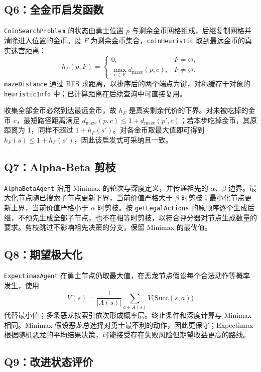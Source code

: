 \documentclass[UTF8,fontset=fandol,a4paper,11pt]{ctexart}
\newcommand{\code}[1]{\texttt{#1}}
\newcommand{\mazed}{d_{\mathrm{maze}}}
\begin{document}
\subsection{Q6：全金币启发函数}

\code{CoinSearchProblem} 的状态由勇士位置 $p$ 与剩余金币网格组成，后继复制网格并清除进入位置的金币。设 $F$ 为剩余金币集合，\code{coinHeuristic} 取到最远金币的真实迷宫距离：
\[
  h_F(p,F)=
  \begin{cases}
    0, & F=\varnothing,\\
    \displaystyle\max_{c\in F}\mazed(p,c), & F\ne\varnothing.
  \end{cases}
\]
\code{mazeDistance} 通过 BFS 求距离，以排序后的两个端点为键，对称缓存于对象的 \code{heuristicInfo} 中；已计算距离在后续查询中可直接复用。

收集全部金币必然到达最远金币，故 $h_F$ 是真实剩余代价的下界。对未被吃掉的金币 $c$，最短路径距离满足 $\mazed(p,c)\leq1+\mazed(p',c)$；若本步吃掉金币，其原距离为 1，同样不超过 $1+h_F(s')$。对各金币取最大值即可得到 $h_F(s)\leq1+h_F(s')$，因此该启发式可采纳且一致。

\subsection{Q7：Alpha-Beta 剪枝}

\code{AlphaBetaAgent} 沿用 Minimax 的轮次与深度定义，并传递祖先的 $\alpha$、$\beta$ 边界。最大化节点随已搜索子节点更新下界，当前价值严格大于 $\beta$ 时剪枝；最小化节点更新上界，当前价值严格小于 $\alpha$ 时剪枝。按 \code{getLegalActions} 的原顺序逐个生成后继，不预先生成全部子节点，也不在相等时剪枝，以符合评分器对节点生成数量的要求。剪枝跳过不影响祖先决策的分支，保留 Minimax 的最优值。

\subsection{Q8：期望极大化}

\code{ExpectimaxAgent} 在勇士节点仍取最大值，在恶龙节点假设每个合法动作等概率发生，使用
\[
  V(s)=\frac{1}{|A(s)|}\sum_{a\in A(s)}V\bigl(\mathrm{Succ}(s,a)\bigr)
\]
代替最小值；多条恶龙按索引依次形成概率层。终止条件和深度计算与 Minimax 相同。Minimax 假设恶龙总选择对勇士最不利的动作，因此更保守；Expectimax 根据随机恶龙的平均结果决策，可能接受存在失败风险但期望收益更高的路线。

\newpage
\subsection{Q9：改进状态评价}
\end{document}
